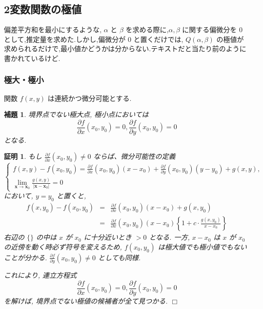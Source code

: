 \documentclass{jsarticle}
\theoremstyle{plain}
\newtheorem{lemm}{補題}[section]
\newtheorem{Proof}{証明}[section]
\def\qed{\hfill $\Box$} %
\begin{document}
  \section{}
  \subsection{2変数関数の極値}
  偏差平方和を最小にするような, $\alpha$ と $\beta$ を求める際に,$\alpha, \beta$ に関する偏微分を $0$ として,推定量を求めた.しかし,偏微分が $0$ と置くだけでは,
  $Q(\alpha, \beta)$ の極値が求められるだけで,最小値かどうかは分からない.テキストだと当たり前のように書かれているけど.

  \subsubsection{極大・極小}
  関数 $f(x, y)$ は連続かつ微分可能とする.
  \begin{lemm}
  境界点\footnotemark でない極大点, 極小点においては
    \begin{equation}
      \frac{\partial f}{\partial x}(x_0, y_0) = 0, \frac{\partial f}{\partial y}(x_0, y_0) = 0
    \end{equation}
  となる.
  \end{lemm}
  \begin{Proof}
  もし $\frac{\partial f}{\partial x}(x_0, y_0) \neq 0$ ならば、微分可能性の定義\footnotemark
    \begin{equation*}
      \begin{cases}
        f(x, y) - f(x_0, y_0) = \frac{\partial f}{\partial x}(x_0, y_0)(x - x_0) + \frac{\partial f}{\partial y}(x_0, y_0)(y - y_0) + g(x, y), \\
        \lim_{\bm{x} \to \bm{x}_0} \frac{g(x, y)}{|\bm{x} - \bm{x}_0 |} = 0
      \end{cases}
    \end{equation*}
    において, $y = y_0$ と置くと,
    \begin{eqnarray*}
      f(x, y_0) - f(x_0, y_0) &=& \frac{\partial f}{\partial x}(x_0, y_0)(x - x_0) + g(x, y_0) \\
       &=& \frac{\partial f}{\partial x}(x_0, y_0)(x - x_0)\left\{ 1 + c \cdot \frac{g(x, y_0)}{x - x_0} \right\}
    \end{eqnarray*}
    右辺の $\{  \}$ の中は $x$ が $x_0$ に十分近いとき $> 0$ となる. 一方, $x - x_0$ は $x$ が $x_0$ の近傍を動く時必ず符号を変えるため, 
    $f(x_0, y_0)$ は極大値でも極小値でもないことが分かる. $\frac{\partial f}{\partial y}(x_0, y_0) \neq 0$ としても同様.

    これにより, 連立方程式
    \begin{equation*}
      \frac{\partial f}{\partial x}(x_0, y_0) = 0, \frac{\partial f}{\partial y}(x_0, y_0) = 0
    \end{equation*}
    を解けば, 境界点でない極値の候補者が全て見つかる. \qed
  \end{Proof}
\end{document}
